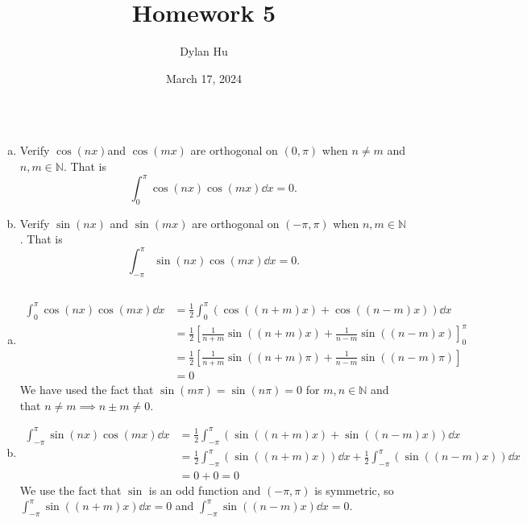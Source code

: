 \documentclass[plain]{pset}
\title{Homework 5}
\author{Dylan Hu}
\date{March 17, 2024}
\begin{document}
\maketitle

\pagebreak

\begin{problem}
\[\]
\vspace{-4em}
\begin{enumerate}[a.]
    \item Verify \(\cos(nx)\)and \(\cos(mx)\) are orthogonal on \((0, \pi)\) when \(n \neq m\) and \(n, m \in \mathbb{N}\). That is
          \[
              \int_0^\pi \cos(nx)\cos(mx) \dd x= 0.
          \]
    \item Verify \(\sin(nx)\) and \(\sin(mx)\) are orthogonal on \((-\pi, \pi)\) when \(n, m \in \mathbb{N}\). That is
          \[
              \int_{-\pi}^\pi \sin(nx)\cos(mx) \dd x= 0.
          \]
\end{enumerate}
\end{problem}
\begin{solution}
    \[\]
    \vspace{-4em}
    \begin{enumerate}[a.]
        \item
              \begin{align*}
                  \int_0^\pi \cos(nx)\cos(mx) \dd x & = \frac{1}{2}\int_0^\pi \left(\cos((n+m)x) + \cos((n-m)x)\right) \dd x                 \\
                                                    & = \frac{1}{2}\left[\frac{1}{n+m}\sin((n+m)x) + \frac{1}{n-m}\sin((n-m)x) \right]_0^\pi \\
                                                    & = \frac{1}{2}\left[\frac{1}{n+m}\sin((n+m)\pi) + \frac{1}{n-m}\sin((n-m)\pi) \right]   \\
                                                    & = 0
              \end{align*}
              We have used the fact that \(\sin(m\pi) = \sin(n\pi)= 0\) for \(m, n \in \mathbb{N}\) and that \(n \neq m \implies n \pm m \neq 0\).
        \item
              \begin{align*}
                  \int_{-\pi}^\pi \sin(nx)\cos(mx) \dd x & = \frac{1}{2} \int_{-\pi}^\pi \left(\sin((n+m)x) + \sin((n-m)x)\right) \dd x                                                 \\
                                                         & = \frac{1}{2} \int_{-\pi}^\pi \left(\sin((n+m)x) \right) \dd x + \frac{1}{2} \int_{-\pi}^\pi \left(\sin((n-m)x)\right) \dd x \\
                                                         & = 0 + 0 = 0
              \end{align*}
              We use the fact that \(\sin\) is an odd function and \((-\pi, \pi)\) is symmetric, so \(\int_{-\pi}^\pi \sin((n+m)x) \dd x = 0\) and \(\int_{-\pi}^\pi \sin((n-m)x) \dd x = 0\).
    \end{enumerate}
\end{solution}
\end{document}
